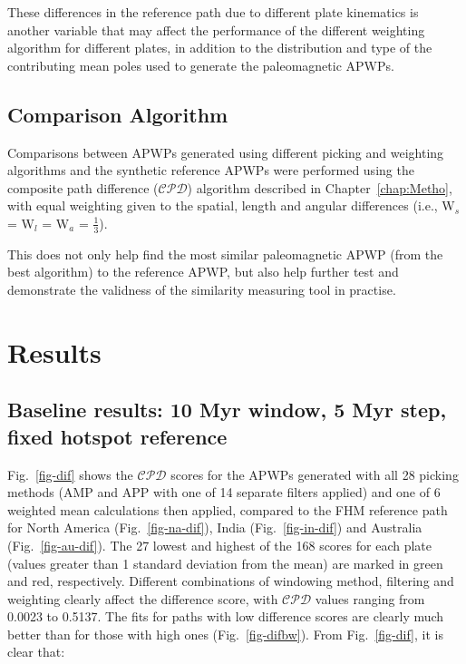 These differences in the reference path due to different plate kinematics is
another variable that may affect the performance of the different weighting
algorithm for different plates, in addition to the distribution and type of the
contributing mean poles used to generate the paleomagnetic APWPs.

\subsection{Comparison Algorithm}

Comparisons between APWPs generated using different picking and weighting
algorithms and the synthetic reference APWPs were performed using the composite
path difference ($\mathcal{CPD}$) algorithm described in Chapter~\ref{chap:Metho}, with equal
weighting given to the spatial, length and angular differences (i.e., W$_s$ =
W$_l$ = W$_a$ = $\frac{1}{3}$).

This does not only help find the most similar paleomagnetic APWP (from the best
algorithm) to the reference APWP, but also help further test and demonstrate the
validness of the similarity measuring tool in practise.

\section{Results}

\subsection{Baseline results: 10 Myr window, 5 Myr step, fixed hotspot
reference}

Fig.~\ref{fig-dif} shows the $\mathcal{CPD}$ scores for the APWPs generated with
all 28 picking methods (AMP and APP with one of 14 separate filters applied) and
one of 6 weighted mean calculations then applied, compared to the FHM reference
path for North America (Fig.~\ref{fig-na-dif}), India (Fig.~\ref{fig-in-dif})
and Australia (Fig.~\ref{fig-au-dif}). The 27 lowest and highest of the 168
scores for each plate (values greater than 1 standard deviation from the mean)
are marked in green and red, respectively. Different combinations of windowing
method, filtering and weighting clearly affect the difference score, with
$\mathcal{CPD}$ values ranging from 0.0023 to 0.5137. The fits for paths with
low difference scores are clearly much better than for those with high ones
(Fig.~\ref{fig-difbw}). From Fig.~\ref{fig-dif}, it is clear that:

